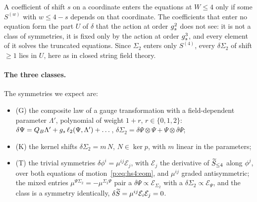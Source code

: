 A coefficient of shift $s$ on a coordinate enters the equations at $W \le 4$ only if some $S^{(w)}$ with $w \le 4 - s$ depends on that coordinate.
The coefficients that enter no equation form the part $U$ of $\delta$ that the action at order $\gs^2$ does not see: it is not a class of symmetries, it is fixed only by the action at order $\gs^3$, and every element of it solves the truncated equations.
Since $\Sigma_2$ enters only $S^{(4)}$, every $\delta \Sigma_2$ of shift $\ge 1$ lies in $U$, here as in closed string field theory.

\paragraph{The three classes.}
The symmetries we expect are:
\begin{itemize}
  \item (G) the composite law of a gauge transformation with a field-dependent parameter $\Lambda'$, polynomial of weight $1 + r$, $r \in \{ 0, 1, 2 \}$: $\delta \Psi = Q_B \Lambda' + \gs \, \ell_2(\Psi, \Lambda') + \dots$, $\delta \Sigma_2 = \delta \Psi \otimes \Psi + \Psi \otimes \delta \Psi$;
  \item (K) the kernel shifts $\delta \Sigma_2 = m \, N$, $N \in \ker p$, with $m$ linear in the parameters;
  \item (T) the trivial symmetries $\delta \phi^i = \mu^{ij} \mathcal E_j$, with $\mathcal E_j$ the derivative of $\caction[\le 4]$ along $\phi^j$, over both equations of motion~\eqref{p:eq:hs4:eom}, and $\mu^{ij}$ graded antisymmetric; the mixed entries $\mu^{\Psi \Sigma_2} = - \mu^{\Sigma_2 \Psi}$ pair a $\delta \Psi \propto \mathcal E_{\Sigma_2}$ with a $\delta \Sigma_2 \propto \mathcal E_\Psi$, and the class is a symmetry identically, $\delta \caction = \mu^{ij} \mathcal E_i \mathcal E_j = 0$.
\end{itemize}

